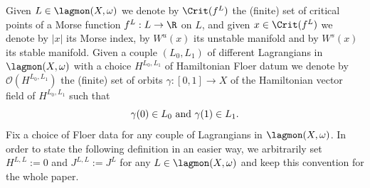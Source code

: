 Given $L\in \lagmon(X,\omega)$ we denote by $\Crit(f^L)$ the (finite) set of critical points of a Morse function $f^L:L\to \R$ on $L$, and given $x\in \Crit(f^L)$ we denote by $|x|$ its Morse index, by $W^u(x)$ its unstable manifold and by $W^s(x)$ its stable manifold. Given a couple $(L_0,L_1)$ of different Lagrangians in $\lagmon(X,\omega)$ with a choice $H^{L_0,L_1}$ of Hamiltonian Floer datum we denote by $\mathcal{O}(H^{L_0,L_1})$ the (finite) set of orbits $\gamma:[0,1]\to X$ of the Hamiltonian vector field of $H^{L_0,L_1}$ such that $$\gamma(0)\in L_0 \textnormal{   and   }\gamma(1)\in L_1.$$
Fix a choice of Floer data for any couple of Lagrangians in $\lagmon(X,\omega)$. In order to state the following definition in an easier way, we arbitrarily set $H^{L,L}:=0$ and $J^{L,L}:=J^L$ for any $L\in \lagmon(X, \omega)$ and keep this convention for the whole paper.
